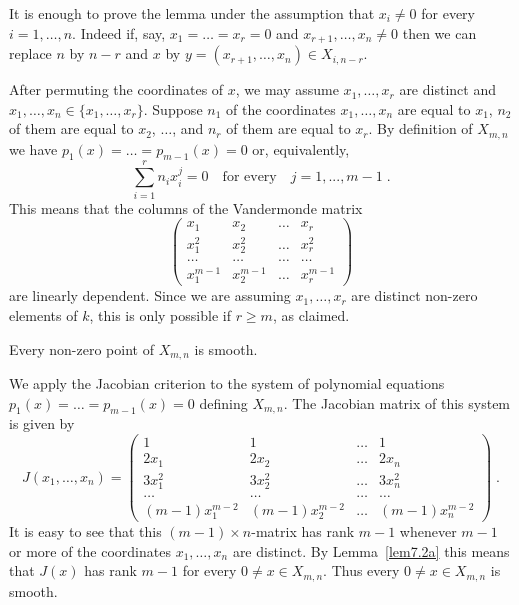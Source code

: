 \begin{pf} It is enough to prove the lemma under the assumption that
$x_i \neq 0$ for every $i = 1, \ldots, n$. Indeed if, say, 
$x_1 = \ldots = x_r =0$ and $x_{r+1}, \ldots, x_n \neq 0$ then 
we can replace $n$ by $n-r$ and $x$ by 
$y= (x_{r+1}, \ldots, x_n) \in X_{i, n-r}$. 

After permuting the coordinates of $x$, we may assume $x_1, \ldots, x_r$ are
distinct and $x_1, \ldots, x_n \in \{x_1, \ldots, x_r\}$. Suppose
$n_1$ of the coordinates $x_1, \ldots, x_n$ are equal to $x_1$,
$n_2$ of them are equal to $x_2$, $\dots$, and $n_r$ of them are equal to
$x_r$. By definition of $X_{m, n}$ we have
$p_1(x) = \ldots = p_{m-1}(x) = 0$ or, equivalently,  
\[ \sum_{i=1}^r n_i x_i^j = 0 \quad \text{for every} \quad j=1,...,m-1 \; .\]
This means that the columns of the Vandermonde matrix
\[ \left( \begin{matrix} x_1 & x_2 & \hdots & x_r \\
                         x_1^2 & x_2^2 & \hdots & x_r^2 \\
                         \dots & \dots & \dots & \dots \\
                         x_1^{m-1} & x_2^{m-1} & \hdots & x_r^{m-1} 
\end{matrix} \right) \]
are linearly dependent. Since we are assuming $x_1, \ldots, x_r$ 
are distinct non-zero elements of $k$, this is only possible 
if $r \geq m$, as claimed. 
\end{pf}

\begin{lem} \label{lem7.2b}
Every non-zero point of $X_{m, n}$ is smooth.
\end{lem}

\begin{pf}
We apply the Jacobian criterion to the system of polynomial equations
$p_1(x) = \dots = p_{m-1}(x) = 0$ defining $X_{m, n}$. The Jacobian matrix
of this system is given by
\[ J(x_1, \ldots, x_n) = \left( \begin{matrix} 1 & 1 & \hdots & 1 \\
                         2x_1 & 2x_2 & \hdots & 2x_n \\
                         3x_1^2 & 3x_2^2 & \hdots & 3x_n^2 \\
                         \dots & \dots & \dots & \dots \\
                  (m-1) x_1^{m-2} & (m-1) x_2^{m-2} & \hdots & (m-1) x_n^{m-2} 
\end{matrix} \right) \; . \]
It is easy to see that this $(m-1) \times n$-matrix
has rank $m-1$ whenever $m-1$ or more of the coordinates
$x_1, \ldots, x_n$ are distinct. By Lemma~\ref{lem7.2a} this means that
$J(x)$ has rank $m-1$ for every $0 \neq x \in X_{m,n}$. Thus every 
$0 \neq x \in X_{m,n}$ is smooth.
\end{pf}

